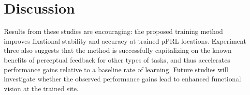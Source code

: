 \section*{Discussion}
Results from these studies are encouraging: the proposed training method improves fixational stability and accuracy at trained pPRL locations. Experiment three also suggests that the method is successfully capitalizing on the known benefits of perceptual feedback for other types of tasks, and thus accelerates performance gains relative to a baseline rate of learning. Future studies will investigate whether the observed performance gains lead to enhanced functional vision at the trained site.
